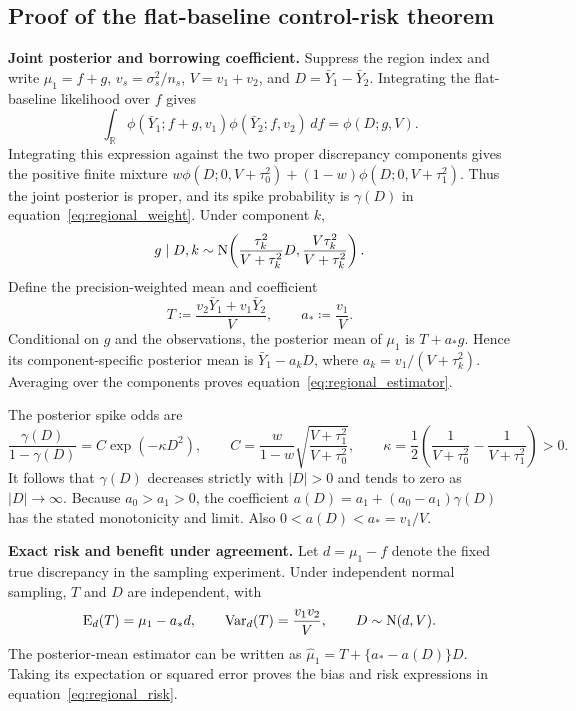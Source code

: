\subsection{Proof of the flat-baseline control-risk theorem}\label{sec:C.3}
\noindent\textbf{Joint posterior and borrowing coefficient.}
Suppress the region index and write $\mu_1=f+g$, $v_s=\sigma_s^2/n_s$, $V=v_1+v_2$, and $D=\bar Y_1-\bar Y_2$. Integrating the flat-baseline likelihood over $f$ gives
\begin{equation}\label{eq:regional_flat_integral}
\int_{\mathbb R}\phi(\bar Y_1;f+g,v_1)\phi(\bar Y_2;f,v_2)\,df
=\phi(D;g,V).
\end{equation}
Integrating this expression against the two proper discrepancy components gives the positive finite mixture $w\phi(D;0,V+\tau_0^2)+(1-w)\phi(D;0,V+\tau_1^2)$. Thus the joint posterior is proper, and its spike probability is $\gamma(D)$ in equation~\eqref{eq:regional_weight}. Under component $k$,
\[
g\mid D,k\sim\mathrm{N}\!\left(\frac{\tau_k^2}{V+\tau_k^2}D,
\frac{V\tau_k^2}{V+\tau_k^2}\right).
\]
Define the precision-weighted mean and coefficient
\begin{equation}\label{eq:regional_T}
T\coloneqq\frac{v_2\bar Y_1+v_1\bar Y_2}{V},\qquad a_*\coloneqq\frac{v_1}{V}.
\end{equation}
Conditional on $g$ and the observations, the posterior mean of $\mu_1$ is $T+a_*g$. Hence its component-specific posterior mean is $\bar Y_1-a_kD$, where $a_k=v_1/(V+\tau_k^2)$. Averaging over the components proves equation~\eqref{eq:regional_estimator}.

The posterior spike odds are
\begin{equation}\label{eq:regional_odds}
\frac{\gamma(D)}{1-\gamma(D)}
=C\exp(-\kappa D^2),\qquad
C=\frac{w}{1-w}\sqrt{\frac{V+\tau_1^2}{V+\tau_0^2}},\qquad
\kappa=\frac12\left(\frac1{V+\tau_0^2}-\frac1{V+\tau_1^2}\right)>0.
\end{equation}
It follows that $\gamma(D)$ decreases strictly with $|D|>0$ and tends to zero as $|D|\to\infty$. Because $a_0>a_1>0$, the coefficient $a(D)=a_1+(a_0-a_1)\gamma(D)$ has the stated monotonicity and limit. Also $0<a(D)<a_*=v_1/V$.

\noindent\textbf{Exact risk and benefit under agreement.}
Let $d=\mu_1-f$ denote the fixed true discrepancy in the sampling experiment. Under independent normal sampling, $T$ and $D$ are independent, with
\begin{equation}\label{eq:regional_T_distribution}
\operatorname{E}_d(T)=\mu_1-a_*d,\qquad
\operatorname{Var}_d(T)=\frac{v_1v_2}{V},\qquad D\sim\mathrm{N}(d,V).
\end{equation}
The posterior-mean estimator can be written as $\widehat\mu_1=T+\{a_*-a(D)\}D$. Taking its expectation or squared error proves the bias and risk expressions in equation~\eqref{eq:regional_risk}.

